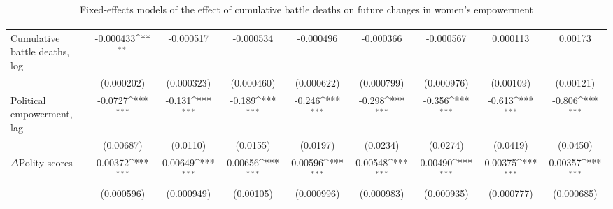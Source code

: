 \begin{table}[htbp]\centering
\def\sym#1{\ifmmode^{#1}\else\(^{#1}\)\fi}
\caption{Fixed-effects models of the effect of cumulative battle deaths on future changes in women's empowerment\label{culmudeaths}}
\begin{tabular}{l*{8}{c}}
\hline\hline
                    &&&&&&&&\\
\hline
Cumulative battle deaths, log    &   -0.000433\sym{**} &   -0.000517         &   -0.000534         &   -0.000496         &   -0.000366         &   -0.000567         &    0.000113         &     0.00173         \\
                    &  (0.000202)         &  (0.000323)         &  (0.000460)         &  (0.000622)         &  (0.000799)         &  (0.000976)         &   (0.00109)         &   (0.00121)         \\
[1em]
Political empowerment, lag  &     -0.0727\sym{***}&      -0.131\sym{***}&      -0.189\sym{***}&      -0.246\sym{***}&      -0.298\sym{***}&      -0.356\sym{***}&      -0.613\sym{***}&      -0.806\sym{***}\\
                    &   (0.00687)         &    (0.0110)         &    (0.0155)         &    (0.0197)         &    (0.0234)         &    (0.0274)         &    (0.0419)         &    (0.0450)         \\
[1em]
$\Delta$Polity scores           &     0.00372\sym{***}&     0.00649\sym{***}&     0.00656\sym{***}&     0.00596\sym{***}&     0.00548\sym{***}&     0.00490\sym{***}&     0.00375\sym{***}&     0.00357\sym{***}\\
                    &  (0.000596)         &  (0.000949)         &   (0.00105)         &  (0.000996)         &  (0.000983)         &  (0.000935)         &  (0.000777)         &  (0.000685)         \\

\end{tabular}
\end{table}
